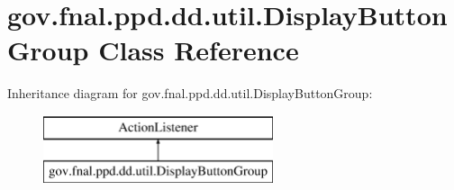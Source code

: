 \hypertarget{classgov_1_1fnal_1_1ppd_1_1dd_1_1util_1_1DisplayButtonGroup}{\section{gov.\-fnal.\-ppd.\-dd.\-util.\-Display\-Button\-Group Class Reference}
\label{classgov_1_1fnal_1_1ppd_1_1dd_1_1util_1_1DisplayButtonGroup}
}
Inheritance diagram for gov.\-fnal.\-ppd.\-dd.\-util.\-Display\-Button\-Group\-:\begin{figure}[H]
\begin{center}
\leavevmode
\includegraphics[height=2.000000cm]{classgov_1_1fnal_1_1ppd_1_1dd_1_1util_1_1DisplayButtonGroup}
\end{center}
\end{figure}
